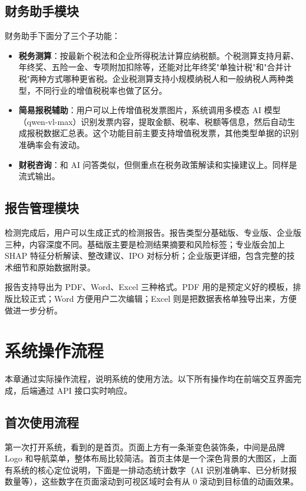 \documentclass[12pt,a4paper]{ctexart}
\begin{document}
\subsection{财务助手模块}

财务助手下面分了三个子功能：

\begin{itemize}
    \item \textbf{税务测算}：按最新个税法和企业所得税法计算应纳税额。个税测算支持月薪、年终奖、五险一金、专项附加扣除等，还能对比年终奖"单独计税"和"合并计税"两种方式哪种更省税。企业税测算支持小规模纳税人和一般纳税人两种类型，不同行业的增值税税率也做了区分。
    \item \textbf{简易报税辅助}：用户可以上传增值税发票图片，系统调用多模态 AI 模型（qwen-vl-max）识别发票内容，提取金额、税率、税额等信息，然后自动生成报税数据汇总表。这个功能目前主要支持增值税发票，其他类型单据的识别准确率会有波动。
    \item \textbf{财税咨询}：和 AI 问答类似，但侧重点在税务政策解读和实操建议上。同样是流式输出。
\end{itemize}

\subsection{报告管理模块}

检测完成后，用户可以生成正式的检测报告。报告类型分基础版、专业版、企业版三种，内容深度不同。基础版主要是检测结果摘要和风险标签；专业版会加上 SHAP 特征分析解读、整改建议、IPO 对标分析；企业版更详细，包含完整的技术细节和原始数据附录。

报告支持导出为 PDF、Word、Excel 三种格式。PDF 用的是预定义好的模板，排版比较正式；Word 方便用户二次编辑；Excel 则是把数据表格单独导出来，方便做进一步分析。

\newpage

\section{系统操作流程}

本章通过实际操作流程，说明系统的使用方法。以下所有操作均在前端交互界面完成，后端通过 API 接口实时响应。

\subsection{首次使用流程}

第一次打开系统，看到的是首页。页面上方有一条渐变色装饰条，中间是品牌 Logo 和导航菜单，整体布局比较简洁。首页主体是一个深色背景的大图区，上面有系统的核心定位说明，下面是一排动态统计数字（AI 识别准确率、已分析财报数量等），这些数字在页面滚动到可视区域时会有从 0 滚动到目标值的动画效果。
\end{document}
